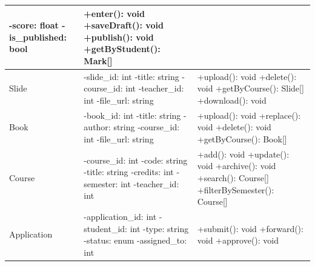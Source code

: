 \documentclass[12pt,a4paper]{article}
\begin{document}
\begin{longtable}{|p{2.8cm}|p{5.5cm}|p{5.2cm}|}
-score: float \newline
-is\_published: bool &
+enter(): void \newline
+saveDraft(): void \newline
+publish(): void \newline
+getByStudent(): Mark[] \\
\hline
Slide &
-slide\_id: int \newline
-title: string \newline
-course\_id: int \newline
-teacher\_id: int \newline
-file\_url: string &
+upload(): void \newline
+delete(): void \newline
+getByCourse(): Slide[] \newline
+download(): void \\
\hline
Book &
-book\_id: int \newline
-title: string \newline
-author: string \newline
-course\_id: int \newline
-file\_url: string &
+upload(): void \newline
+replace(): void \newline
+delete(): void \newline
+getByCourse(): Book[] \\
\hline
Course &
-course\_id: int \newline
-code: string \newline
-title: string \newline
-credits: int \newline
-semester: int \newline
-teacher\_id: int &
+add(): void \newline
+update(): void \newline
+archive(): void \newline
+search(): Course[] \newline
+filterBySemester(): Course[] \\
\hline
Application &
-application\_id: int \newline
-student\_id: int \newline
-type: string \newline
-status: enum \newline
-assigned\_to: int &
+submit(): void \newline
+forward(): void \newline
+approve(): void \newline

\end{longtable}
\end{document}
